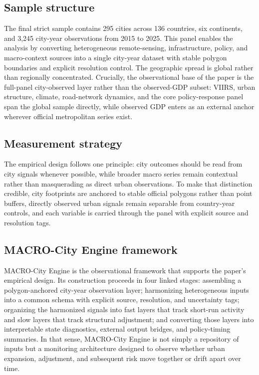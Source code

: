 \documentclass[oneside,pdflatex,sn-nature]{sn-jnl}
\begin{document}
\subsection{Sample structure}
The final strict sample contains 295 cities across 136 countries, six continents, and 3,245 city-year observations from 2015 to 2025. This panel enables the analysis by converting heterogeneous remote-sensing, infrastructure, policy, and macro-context sources into a single city-year dataset with stable polygon boundaries and explicit resolution control. The geographic spread is global rather than regionally concentrated. Crucially, the observational base of the paper is the full-panel city-observed layer rather than the observed-GDP subset: VIIRS, urban structure, climate, road-network dynamics, and the core policy-response panel span the global sample directly, while observed GDP enters as an external anchor wherever official metropolitan series exist.

\subsection{Measurement strategy}
The empirical design follows one principle: city outcomes should be read from city signals whenever possible, while broader macro series remain contextual rather than masquerading as direct urban observations.\cite{oecd2007territorial} To make that distinction credible, city footprints are anchored to stable official polygons rather than point buffers, directly observed urban signals remain separable from country-year controls, and each variable is carried through the panel with explicit source and resolution tags.

\subsection{MACRO-City Engine framework}
MACRO-City Engine is the observational framework that supports the paper's empirical design. Its construction proceeds in four linked stages: assembling a polygon-anchored city-year observation layer; harmonizing heterogeneous inputs into a common schema with explicit source, resolution, and uncertainty tags; organizing the harmonized signals into fast layers that track short-run activity and slow layers that track structural adjustment; and converting those layers into interpretable state diagnostics, external output bridges, and policy-timing summaries. In that sense, MACRO-City Engine is not simply a repository of inputs but a monitoring architecture designed to observe whether urban expansion, adjustment, and subsequent risk move together or drift apart over time.
\end{document}
